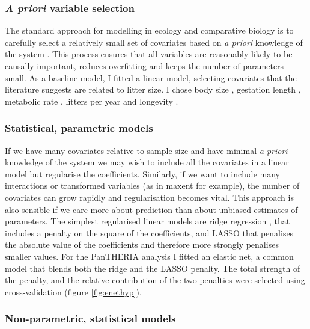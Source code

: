 \documentclass[10pt,]{article}
\begin{document}
\subsubsection{\texorpdfstring{\emph{A priori} variable selection}{A priori variable selection}}\label{a-priori-variable-selection}

The standard approach for modelling in ecology and comparative biology is to carefully select a relatively small set of covariates based on \emph{a priori} knowledge of the system \citep{whittingham2006we}.
This process ensures that all variables are reasonably likely to be causally important, reduces overfitting and keeps the number of parameters small.
As a baseline model, I fitted a linear model, selecting covariates that the literature suggests are related to litter size.
I chose body size \citep{leutenegger1979evolution, tuomi1980mammalian}, gestation length \citep{okkens1993influence, bielby2007fast}, metabolic rate \citep{white2004does}, litters per year \citep{white2004does} and longevity \citep{wilkinson2002life, zammuto1986life}.


\subsubsection{Statistical, parametric models}\label{statistical-parametric-models}

If we have many covariates relative to sample size and have minimal \emph{a priori} knowledge of the system we may wish to include all the covariates in a linear model but regularise the coefficients.
Similarly, if we want to include many interactions or transformed variables (as in maxent \citep{maxent} for example), the number of covariates can grow rapidly and regularisation becomes vital.
This approach is also sensible if we care more about prediction than about unbiased estimates of parameters.
The simplest regularised linear models are ridge regression \citep{ridge}, that includes a penalty on the square of the coefficients, and LASSO \citep{tibshirani1996regression} that penalises the absolute value of the coefficients and therefore more strongly penalises smaller values.
For the PanTHERIA analysis I fitted an elastic net, a common model that blends both the ridge and the LASSO penalty.
The total strength of the penalty, and the relative contribution of the two penalties were selected using cross-validation (figure \ref{fig:enethyp}).

\subsubsection{Non-parametric, statistical models}\label{non-parametric-statistical-models}
\end{document}
